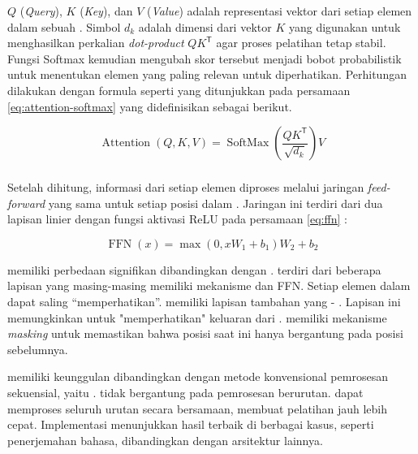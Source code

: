 $Q$ (\emph{Query}), $K$ (\emph{Key}), dan $V$ (\emph{Value}) adalah representasi vektor dari setiap elemen dalam sebuah \sequence. Simbol $d_k$ adalah dimensi dari vektor $K$ yang digunakan untuk menghasilkan perkalian \emph{dot-product} $QK^\mathsf{T}$ agar proses pelatihan tetap stabil. Fungsi Softmax kemudian mengubah skor tersebut menjadi bobot probabilistik untuk menentukan elemen yang paling relevan untuk diperhatikan.
\newpage
Perhitungan \attention{} dilakukan dengan formula seperti yang ditunjukkan pada persamaan \eqref{eq:attention-softmax} \parencite{vaswani2017attention} yang didefinisikan sebagai berikut.

\begin{equation}
	\label{eq:attention-softmax}
		\operatorname{Attention}(Q, K, V) = \operatorname{SoftMax}\left(\frac{QK^\mathsf{T}}{\sqrt{d_k}}\right)V
\end{equation}

\subsubsection{\ffnfull}
Setelah \attention{} dihitung, informasi dari setiap elemen diproses melalui jaringan \emph{feed-forward} yang sama untuk setiap posisi dalam \sequence. Jaringan ini terdiri dari dua lapisan linier dengan fungsi aktivasi ReLU pada persamaan \eqref{eq:ffn} \parencite{vaswani2017attention}:

\begin{equation}
	\label{eq:ffn}
	\operatorname{FFN}(x) = \max(0, xW_1 + b_1)W_2 + b_2
\end{equation}

\decoderfl{} memiliki perbedaan signifikan dibandingkan dengan \encoder. \encoderfl{} terdiri dari beberapa lapisan yang masing-masing memiliki mekanisme \selfattention{} dan FFN. Setiap elemen dalam \sequence{} dapat saling “memperhatikan”. \decoderfl{} memiliki lapisan tambahan yang \encoder{}\--\decoder{} \attention. Lapisan ini memungkinkan \decoder{} untuk "memperhatikan" keluaran dari \encoder. \decoderfl{} memiliki mekanisme \emph{masking} untuk memastikan bahwa posisi saat ini hanya bergantung pada posisi sebelumnya.

\transformer{} memiliki keunggulan dibandingkan dengan metode konvensional pemrosesan sekuensial, yaitu \rnn. \transformer{} tidak bergantung pada pemrosesan berurutan. \transformer{} dapat memproses seluruh urutan secara bersamaan, membuat pelatihan jauh lebih cepat. Implementasi \transformer{} menunjukkan hasil terbaik di berbagai kasus, seperti penerjemahan bahasa, dibandingkan dengan arsitektur lainnya.
